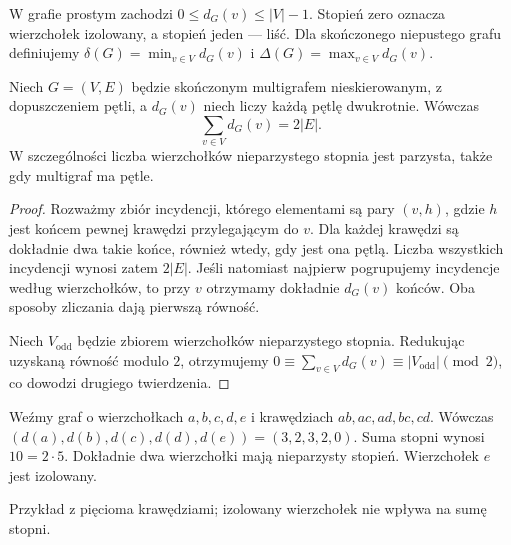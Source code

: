 W grafie prostym zachodzi $0\le d_G(v)\le |V|-1$.
Stopień zero oznacza wierzchołek izolowany, a stopień jeden
--- liść. Dla skończonego niepustego grafu definiujemy
$\delta(G)=\min_{v\in V}d_G(v)$ i
$\Delta(G)=\max_{v\in V}d_G(v)$.

\begin{twierdzenie}
Niech $G=(V,E)$ będzie skończonym multigrafem
nieskierowanym, z dopuszczeniem pętli, a $d_G(v)$
niech liczy każdą pętlę dwukrotnie. Wówczas
\[
\sum_{v\in V}d_G(v)=2|E|.
\]
W szczególności liczba wierzchołków nieparzystego
stopnia jest parzysta, także gdy multigraf ma pętle.
\end{twierdzenie}

\begin{proof}
Rozważmy zbiór incydencji, którego elementami są pary
$(v,h)$, gdzie $h$ jest końcem pewnej krawędzi przylegającym
do $v$. Dla każdej krawędzi są dokładnie dwa takie końce,
również wtedy, gdy jest ona pętlą. Liczba wszystkich
incydencji wynosi zatem $2|E|$. Jeśli natomiast
najpierw pogrupujemy incydencje według wierzchołków,
to przy $v$ otrzymamy dokładnie $d_G(v)$ końców.
Oba sposoby zliczania dają pierwszą równość.

Niech $V_{\mathrm{odd}}$ będzie zbiorem wierzchołków
nieparzystego stopnia. Redukując uzyskaną równość modulo
$2$, otrzymujemy
$0\equiv\sum_{v\in V}d_G(v)\equiv
|V_{\mathrm{odd}}|\pmod2$, co dowodzi drugiego twierdzenia.
\end{proof}

\begin{przyklad}
Weźmy graf o wierzchołkach $a,b,c,d,e$ i krawędziach
$ab,ac,ad,bc,cd$. Wówczas
$(d(a),d(b),d(c),d(d),d(e))=(3,2,3,2,0)$.
Suma stopni wynosi $10=2\cdot5$. Dokładnie dwa
wierzchołki mają nieparzysty stopień. Wierzchołek $e$
jest izolowany.
\end{przyklad}

\begin{center}

{\footnotesize Przykład z pięcioma krawędziami; izolowany
wierzchołek nie wpływa na sumę stopni.}
\end{center}

